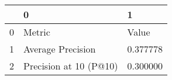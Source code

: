 \begin{tabular}{lll}
\toprule
 & 0 & 1 \\
\midrule
0 & Metric & Value \\
1 & Average Precision & 0.377778 \\
2 & Precision at 10 (P@10) & 0.300000 \\
\bottomrule
\end{tabular}
